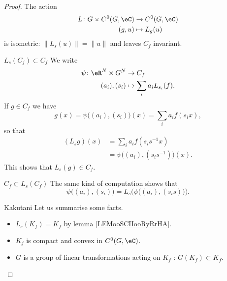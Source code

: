 \begin{proof}
    The action
    \begin{equation}
        \begin{aligned}
            L\colon G\times C^0(G,\eC)&\to C^0(G,\eC) \\
            (g,u)&\mapsto L_g(u) 
        \end{aligned}
    \end{equation}
    is isometric: \( \| L_s(u) \|=\| u \|\) and leaves \( C_f\) invariant.
    \begin{subproof}
    \item[\( L_s(C_f)\subset C_f\)]
        We write
        \begin{equation}
            \begin{aligned}
                \psi\colon \eR^N\times G^N&\to C_f \\
                (a_i), (s_i)&\mapsto \sum_ia_iL_{s_i}(f). 
            \end{aligned}
        \end{equation}
        If \( g\in C_f\) we have
        \begin{equation}
                g(x)=\psi\big( (a_i), (s_i) \big)(x)=\sum_ia_if(s_ix),
        \end{equation}
        so that
        \begin{subequations}
            \begin{align}
                (L_sg)(x) &=\sum_ia_if(s_is^{-1}x)\\
                &=\psi\big( (a_i),(s_is^{-1}) \big)(x).
            \end{align}
        \end{subequations}
        This shows that \( L_s(g)\in C_f\).
    \item[\(C_f\subset L_s( C_f)\)]
        The same kind of computation shows that
        \begin{equation}
            \psi\big( (a_i),(s_i) \big)=L_s\Big( \psi\big( (a_i), (s_is) \big) \Big).
        \end{equation}
    \item[Kakutani]
        Let us summarise some facts.
        \begin{itemize}
            \item
                \( L_s(K_f)=K_f\) by lemma \ref{LEMooSCIIooRyRrHA}. 
            \item 
                \( K_j\) is compact and convex in \( C^0(G,\eC)\).
            \item
                \( G\) is a group of linear transformations acting on \( K_f\) : \( G(K_f)\subset K_f\).

\end{itemize}
\end{subproof}
\end{proof}

